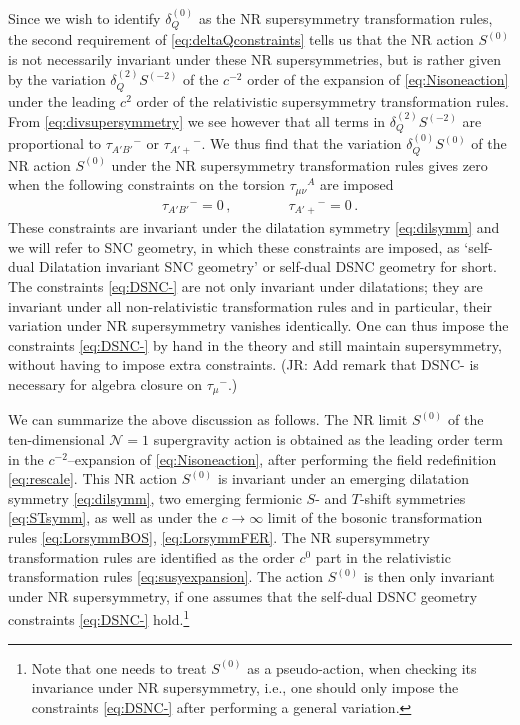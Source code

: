 \documentclass[a4paper,10pt,openany]{article}
\newcommand{\JR}[1]{\textcolor{darkergreen}{#1}}
\begin{document}
	Since we wish to identify $\delta_Q^{(0)}$ as the NR supersymmetry transformation rules, the second requirement of \eqref{eq:deltaQconstraints} tells us that the NR action $S^{(0)}$ is not necessarily invariant under these NR supersymmetries, but is rather given by the variation $\delta_Q^{(2)} S^{(-2)}$ of the $c^{-2}$ order of the expansion of \eqref{eq:Nisoneaction} under the leading $c^2$ order of the relativistic supersymmetry transformation rules. From \eqref{eq:divsupersymmetry} we see however that all terms in $\delta_Q^{(2)} S^{(-2)}$ are proportional to $\tau_{A'B'}{}^-$ or $\tau_{A'+}{}^{-}$. We thus find that the variation $\delta_Q^{(0)} S^{(0)}$ of the NR action $S^{(0)}$ under the NR supersymmetry transformation rules gives zero when the following constraints on the torsion $\tau_{\mu\nu}{}^{A}$ are imposed
	\begin{align}\label{eq:DSNC-}
		\tau_{A'B'}{}^- = 0\,,\qquad \qquad \tau_{A'+}{}^- =0\,.
	\end{align}
	These constraints are invariant under the dilatation symmetry \eqref{eq:dilsymm} and we will refer to SNC geometry, in which these constraints are imposed, as `self-dual Dilatation invariant SNC geometry' or self-dual DSNC geometry for short. The constraints \eqref{eq:DSNC-} are not only invariant under dilatations; they are invariant under all non-relativistic transformation rules and in particular, their variation under NR supersymmetry vanishes identically. One can thus impose the constraints \eqref{eq:DSNC-} by hand in the theory and still maintain supersymmetry, without having to impose extra constraints. \JR{(JR: Add remark that DSNC- is necessary for algebra closure on $\tau_\mu{}^-$.)}
	
	We can summarize the above discussion as follows. The NR limit $S^{(0)}$ of the ten-dimensional $\mathcal{N}=1$ supergravity action is obtained as the leading order term in the $c^{-2}$--expansion of  \eqref{eq:Nisoneaction}, after performing the field redefinition \eqref{eq:rescale}. This NR action $S^{(0)}$ is invariant under an emerging dilatation symmetry \eqref{eq:dilsymm}, two emerging fermionic $S$- and $T$-shift symmetries \eqref{eq:STsymm}, as well as under the $c\rightarrow\infty$ limit of the bosonic transformation rules \eqref{eq:LorsymmBOS}, \eqref{eq:LorsymmFER}. The NR supersymmetry transformation rules are identified as the order $c^0$ part in the relativistic transformation rules \eqref{eq:susyexpansion}. The action $S^{(0)}$ is then only invariant under NR supersymmetry, if one assumes that the self-dual DSNC geometry constraints \eqref{eq:DSNC-} hold.\footnote{Note that one needs to treat $S^{(0)}$ as a pseudo-action, when checking its invariance under NR supersymmetry, i.e., one should only impose the constraints \eqref{eq:DSNC-} after performing a general variation.}
	
\end{document}
